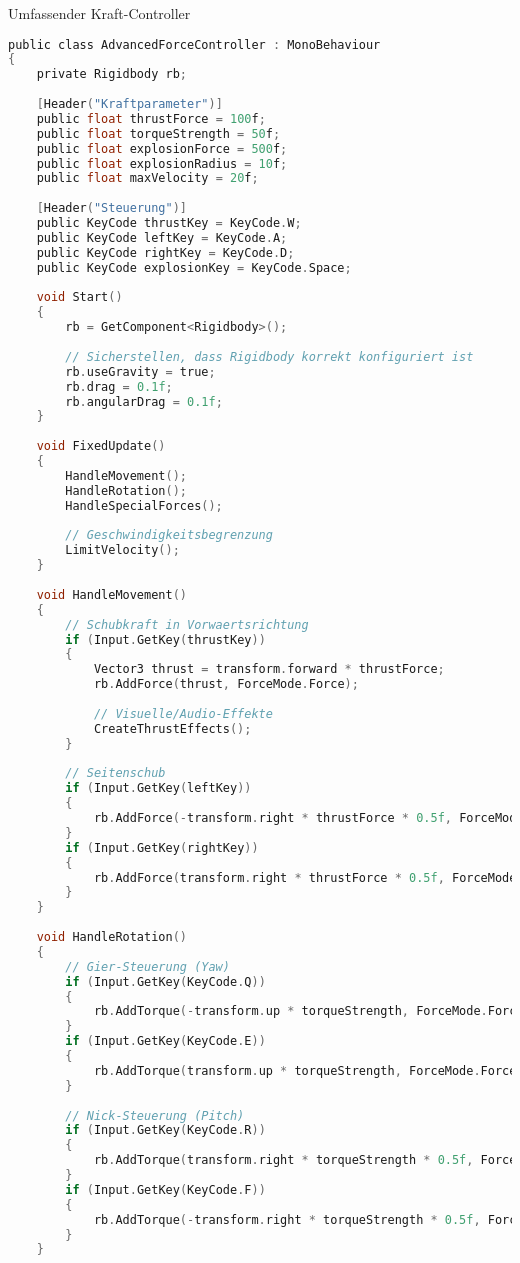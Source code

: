 \begin{code}{Umfassender Kraft-Controller}
\begin{lstlisting}[language=C, style=basesmol]
public class AdvancedForceController : MonoBehaviour 
{
    private Rigidbody rb;
    
    [Header("Kraftparameter")]
    public float thrustForce = 100f;
    public float torqueStrength = 50f;
    public float explosionForce = 500f;
    public float explosionRadius = 10f;
    public float maxVelocity = 20f;
    
    [Header("Steuerung")]
    public KeyCode thrustKey = KeyCode.W;
    public KeyCode leftKey = KeyCode.A;
    public KeyCode rightKey = KeyCode.D;
    public KeyCode explosionKey = KeyCode.Space;
    
    void Start() 
    {
        rb = GetComponent<Rigidbody>();
        
        // Sicherstellen, dass Rigidbody korrekt konfiguriert ist
        rb.useGravity = true;
        rb.drag = 0.1f;
        rb.angularDrag = 0.1f;
    }
    
    void FixedUpdate() 
    {
        HandleMovement();
        HandleRotation();
        HandleSpecialForces();
        
        // Geschwindigkeitsbegrenzung
        LimitVelocity();
    }
    
    void HandleMovement() 
    {
        // Schubkraft in Vorwaertsrichtung
        if (Input.GetKey(thrustKey)) 
        {
            Vector3 thrust = transform.forward * thrustForce;
            rb.AddForce(thrust, ForceMode.Force);
            
            // Visuelle/Audio-Effekte
            CreateThrustEffects();
        }
        
        // Seitenschub
        if (Input.GetKey(leftKey)) 
        {
            rb.AddForce(-transform.right * thrustForce * 0.5f, ForceMode.Force);
        }
        if (Input.GetKey(rightKey)) 
        {
            rb.AddForce(transform.right * thrustForce * 0.5f, ForceMode.Force);
        }
    }
    
    void HandleRotation() 
    {
        // Gier-Steuerung (Yaw)
        if (Input.GetKey(KeyCode.Q)) 
        {
            rb.AddTorque(-transform.up * torqueStrength, ForceMode.Force);
        }
        if (Input.GetKey(KeyCode.E)) 
        {
            rb.AddTorque(transform.up * torqueStrength, ForceMode.Force);
        }
        
        // Nick-Steuerung (Pitch)
        if (Input.GetKey(KeyCode.R)) 
        {
            rb.AddTorque(transform.right * torqueStrength * 0.5f, ForceMode.Force);
        }
        if (Input.GetKey(KeyCode.F)) 
        {
            rb.AddTorque(-transform.right * torqueStrength * 0.5f, ForceMode.Force);
        }
    }
    

\end{lstlisting}
\end{code}
